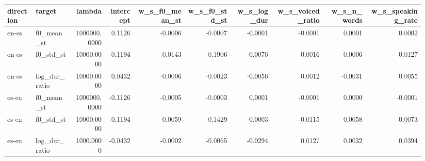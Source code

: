 \begin{tabular}{llrrrrrrrr}
\toprule
direction & target & lambda & intercept & w_s_f0_mean_st & w_s_f0_std_st & w_s_log_dur & w_s_voiced_ratio & w_s_n_words & w_s_speaking_rate \\
\midrule
en-es & f0_mean_st & 1000000.0000 & 0.1126 & -0.0006 & -0.0007 & -0.0001 & -0.0001 & 0.0001 & 0.0002 \\
en-es & f0_std_st & 10000.0000 & -0.1194 & -0.0143 & -0.1906 & -0.0076 & -0.0016 & 0.0006 & 0.0127 \\
en-es & log_dur_ratio & 10000.0000 & 0.0432 & -0.0006 & -0.0023 & -0.0056 & 0.0012 & -0.0031 & 0.0055 \\
es-en & f0_mean_st & 1000000.0000 & -0.1126 & -0.0005 & -0.0003 & 0.0001 & -0.0001 & 0.0000 & -0.0001 \\
es-en & f0_std_st & 10000.0000 & 0.1194 & 0.0059 & -0.1429 & 0.0003 & -0.0115 & 0.0058 & 0.0073 \\
es-en & log_dur_ratio & 1000.0000 & -0.0432 & -0.0002 & -0.0065 & -0.0294 & 0.0127 & 0.0032 & 0.0394 \\
\bottomrule
\end{tabular}
